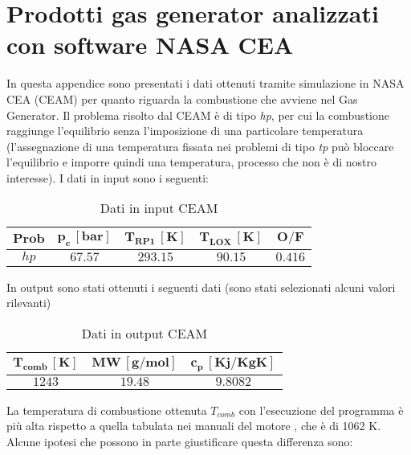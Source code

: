 \section{Prodotti gas generator analizzati con software NASA CEA}
\label{appendix:prodotti_gas_generator}
In questa appendice sono presentati i dati ottenuti tramite simulazione in NASA CEA (CEAM) per quanto riguarda la combustione che avviene nel Gas Generator. Il problema risolto dal CEAM è di tipo \textit{hp}, per cui la combustione raggiunge l'equilibrio senza l'imposizione di una particolare temperatura (l'assegnazione di una temperatura fissata nei problemi di tipo \textit{tp} può bloccare l'equilibrio e imporre quindi una temperatura, processo che non è di nostro interesse). I dati in input sono i seguenti:
\\
\begin{table}[H]

\centering
\begin{tabular}{|c|c|c|c|c|}
\hline
$\bm{Prob}$ & $\bm{p_c \, [bar]}$ & $\bm{T_{RP1} \, [K]}$ & $\bm{T_{LOX} \, [K]}$ & $\bm{O/F}$ \\
\hline
$hp$ & $67.57$ & $293.15$ & $90.15$ & $0.416$ \\
\hline
\end{tabular}
\caption{Dati in input CEAM}
\label{table:input_CEAM}
\end{table}
In output sono stati ottenuti i seguenti dati (sono stati selezionati alcuni valori rilevanti)
\begin{table}[H]

\centering
\begin{tabular}{|c|c|c|}
\hline
$\bm{T_{comb} \, [K]}$ & $\bm{MW \, [g/mol]}$ & $\bm{c_p \, [Kj/KgK]}$ \\
\hline
$1243$ & $19.48$ & $9.8082$\\
\hline
\end{tabular}

\caption{Dati in output CEAM}
\label{table:output_CEAM}

\end{table}
La temperatura di combustione ottenuta $T_{comb}$ con l'esecuzione del programma è più alta rispetto a quella tabulata nei manuali del motore \cite{f-1_manual}, che è di 1062 K. Alcune ipotesi che possono in parte giustificare questa differenza sono:
